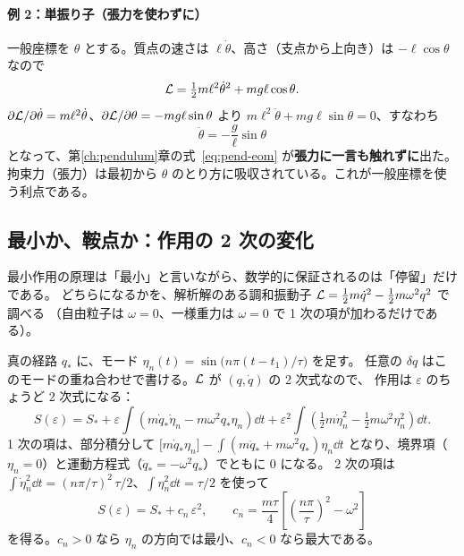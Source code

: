 \paragraph{例 2：単振り子（張力を使わずに）}
一般座標を $\theta$ とする。質点の速さは $\ell\dot\theta$、高さ（支点から上向き）は $-\ell\cos\theta$ なので
\begin{equation}
  \mathcal{L}=\tfrac12m\ell^2\dot\theta^2+mg\ell\cos\theta .
\end{equation}
$\partial\mathcal{L}/\partial\dot\theta=m\ell^2\dot\theta$、$\partial\mathcal{L}/\partial\theta=-mg\ell\sin\theta$ より
$m\ell^2\ddot\theta+mg\ell\sin\theta=0$、すなわち
\begin{equation}
  \ddot\theta=-\frac g\ell\sin\theta
\end{equation}
となって、第\ref{ch:pendulum}章の式~\eqref{eq:pend-eom} が\textbf{張力に一言も触れずに}出た。
拘束力（張力）は最初から $\theta$ のとり方に吸収されている。これが一般座標を使う利点である。

\subsection{最小か、鞍点か：作用の 2 次の変化}\label{sec:second-variation}

最小作用の原理は「最小」と言いながら、数学的に保証されるのは「停留」だけである。
どちらになるかを、解析解のある調和振動子 $\mathcal{L}=\tfrac12m\dot q^2-\tfrac12m\omega^2q^2$ で調べる
（自由粒子は $\omega=0$、一様重力は $\omega=0$ で 1 次の項が加わるだけである）。

真の経路 $q_*$ に、モード $\eta_n(t)=\sin\bigl(n\pi(t-t_1)/\tau\bigr)$ を足す。
任意の $\delta q$ はこのモードの重ね合わせで書ける。$\mathcal{L}$ が $(q,\dot q)$ の 2 次式なので、
作用は $\varepsilon$ のちょうど 2 次式になる：
\begin{equation}
  S(\varepsilon)=S_*+\varepsilon\int(m\dot q_*\dot\eta_n-m\omega^2q_*\eta_n)\dd t
  +\varepsilon^2\int\left(\tfrac12m\dot\eta_n^2-\tfrac12m\omega^2\eta_n^2\right)\dd t .
\end{equation}
1 次の項は、部分積分して $\bigl[m\dot q_*\eta_n\bigr]-\int(m\ddot q_*+m\omega^2q_*)\eta_n\dd t$
となり、境界項（$\eta_n=0$）と運動方程式（$\ddot q_*=-\omega^2q_*$）でともに 0 になる。
2 次の項は $\int\dot\eta_n^2\dd t=(n\pi/\tau)^2\,\tau/2$、$\int\eta_n^2\dd t=\tau/2$ を使って
\begin{equation}
  \boxed{S(\varepsilon)=S_*+c_n\,\varepsilon^2,\qquad
  c_n=\frac{m\tau}{4}\left[\left(\frac{n\pi}{\tau}\right)^2-\omega^2\right]}
  \label{eq:curvature}
\end{equation}
を得る。$c_n>0$ なら $\eta_n$ の方向では最小、$c_n<0$ なら最大である。

